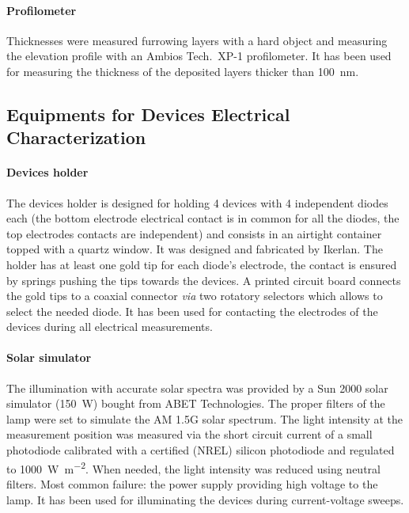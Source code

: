 		\paragraph{Profilometer}
		Thicknesses were measured furrowing layers with a hard object and measuring the elevation profile with an Ambios Tech.\ XP-1 profilometer.
		It has been used for measuring the thickness of the deposited layers thicker than \SI{100}{\nm}.

	\subsection{Equipments for Devices Electrical Characterization}

		\paragraph{Devices holder}
		The devices holder is designed for holding 4 devices with 4 independent diodes each (the bottom electrode electrical contact is in common for all the diodes, the top electrodes contacts are independent) and consists in an airtight container topped with a quartz window.
		It was designed and fabricated by Ikerlan.
		The holder has at least one gold tip for each diode's electrode, the contact is ensured by springs pushing the tips towards the devices.
		A printed circuit board connects the gold tips to a coaxial connector \textit{via} two rotatory selectors which allows to select the needed diode.
		It has been used for contacting the electrodes of the devices during all electrical measurements.

		\paragraph{Solar simulator}\label{solarsimulator}
		The illumination with accurate solar spectra was provided by a Sun 2000 solar simulator (\SI{150}{\W}) bought from ABET Technologies.
		The proper filters of the lamp were set to simulate the AM 1.5G solar spectrum.
		The light intensity at the measurement position was measured via the short circuit current of a small photodiode calibrated with a certified (NREL) silicon photodiode and regulated to \SI{1000}{\W\per\m\squared}.
		When needed, the light intensity was reduced using neutral filters.
		Most common failure: the power supply providing high voltage to the lamp.
		It has been used for illuminating the devices during current-voltage sweeps.

